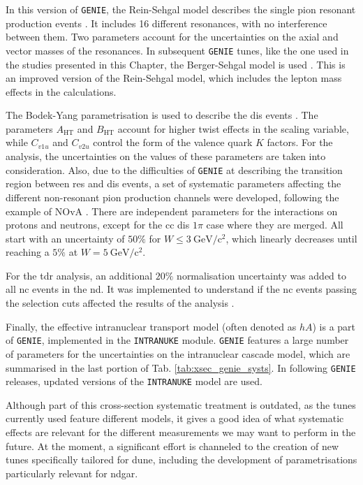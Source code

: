 In this version of \texttt{GENIE}, the Rein-Sehgal model describes the single pion resonant production events \cite{Rein1980}. It includes 16 different resonances, with no interference between them. Two parameters account for the uncertainties on the axial and vector masses of the resonances. In subsequent \texttt{GENIE} tunes, like the one used in the studies presented in this Chapter, the Berger-Sehgal model is used \cite{Berger2007}. This is an improved version of the Rein-Sehgal model, which includes the lepton mass effects in the calculations.

The Bodek-Yang parametrisation is used to describe the \gls{dis} events \cite{Bodek2002}. The parameters $A_{\mathrm{HT}}$ and $B_{\mathrm{HT}}$ account for higher twist effects in the scaling variable, while $C_{v1u}$ and $C_{v2u}$ control the form of the valence quark $K$ factors. For the analysis, the uncertainties on the values of these parameters are taken into consideration. Also, due to the difficulties of \texttt{GENIE} at describing the transition region between \gls{res} and \gls{dis} events, a set of systematic parameters affecting the different non-resonant pion production channels were developed, following the example of NOvA \cite{Sanchez2018}. There are independent parameters for the interactions on protons and neutrons, except for the \gls{cc} \gls{dis} $1\pi$ case where they are merged. All start with an uncertainty of $50\%$ for $W \leq 3~\mathrm{GeV/c^{2}}$, which linearly decreases until reaching a $5\%$ at $W = 5~\mathrm{GeV/c^{2}}$.

For the \gls{tdr} analysis, an additional $20\%$ normalisation uncertainty was added to all \gls{nc} events in the \gls{nd}. It was implemented to understand if the \gls{nc} events passing the selection cuts affected the results of the analysis \cite{DUNE2021}.

Finally, the effective intranuclear transport model (often denoted as $hA$) is a part of \texttt{GENIE}, implemented in the \texttt{INTRANUKE} module. \texttt{GENIE} features a large number of parameters for the uncertainties on the intranuclear cascade model, which are summarised in the last portion of Tab. \ref{tab:xsec_genie_systs}. In following \texttt{GENIE} releases, updated versions of the \texttt{INTRANUKE} model are used.

Although part of this cross-section systematic treatment is outdated, as the tunes currently used feature different models, it gives a good idea of what systematic effects are relevant for the different measurements we may want to perform in the future. At the moment, a significant effort is channeled to the creation of new tunes specifically tailored for \gls{dune}, including the development of parametrisations particularly relevant for \gls{ndgar}.

